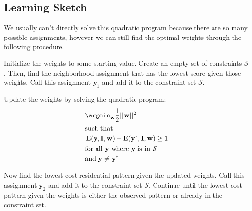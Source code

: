 \subsection*{Learning Sketch}
We usually can't directly solve this quadratic program because there
are so many possible assignments, however we can still find the
optimal weights through the following procedure.

Initialize the weights to some starting value. Create an empty set of
constraints $\mathcal{S}$. Then, find the neighborhood assignment that
has the lowest score given those weights. Call this assignment
$\mathbf{y}_1$ and add it to the constraint set $\mathcal{S}$.

Update the weights by solving the quadratic program: 
%
\begin{align*}
&\argmin_{\mathbf{w}} \frac{1}{2}||\mathbf{w}||^2 \\
&\text{such that} \\
&\operatorname{E}(\mathbf{y}, \mathbf{I}, \mathbf{w})
- \operatorname{E}(\mathbf{y}^*, \mathbf{I}, \mathbf{w}) \geq 1 \\ 
&\text{for all } \mathbf{y} \text{ where } \mathbf{y} \text{ is in } \mathcal{S}\\
&\text{and } \mathbf{y} \neq \mathbf{y}^*
\end{align*}
%

Now find the lowest cost residential pattern given the updated
weights. Call this assignment $\mathbf{y}_2$ and add it to the
constraint set $\mathcal{S}$. Continue until the lowest cost
pattern given the weights is either the observed pattern or
already in the constraint set.\cite{szummer_learning_2008}

